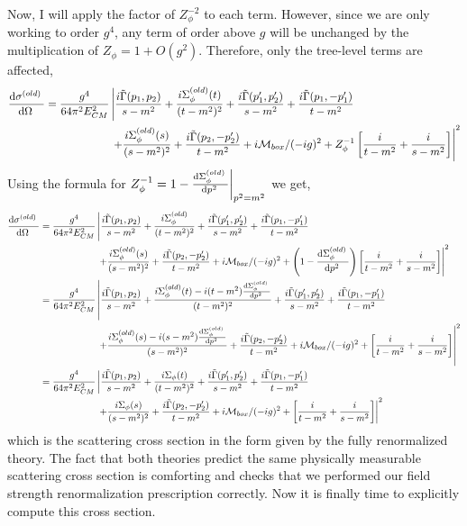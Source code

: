\documentclass[12pt]{extarticle}
\begin{document}
Now, I will apply the factor of $Z_\phi^{-2}$ to each term. However, since we are only working to order $g^4$, any term of order above $g$ will be unchanged by the multiplication of $Z_\phi = 1 + O(g^2)$. Therefore, only the tree-level terms are affected,
\begin{align*}
\frac{\mathrm{d}\sigma^{(old)} \:}{\mathrm{d}\Omega \:} &= \frac{g^4}{64 \pi^2 E_{CM}^2} \left|  \frac{ i\tilde{\Gamma}(p_1, p_2)}{s  - m^2} + \frac{i \Sigma_\phi^{(old)}(t)}{(t - m^2)^2} + \frac{i\tilde{\Gamma}(p_1', p_2')}{s - m^2} 
+  \frac{i\tilde{\Gamma}(p_1, -p_1')}{t - m^2} \right.
\\ 
& \left.
\quad \quad \quad \quad \quad \quad 
+ \frac{i \Sigma_\phi^{(old)}(s)}{(s - m^2)^2} + \frac{i\tilde{\Gamma}(p_2, -p_2')}{t - m^2} + i\mathcal{M}_{box}/(-ig)^2 + Z_\phi^{-1} \left[\frac{i}{t - m^2 } + \frac{i}{s - m^2 }\right] \right|^2 
\end{align*}  
Using the formula for $Z_\phi^{-1} = 1 - \frac{\mathrm{d}\Sigma_\phi^{(old)} \:}{\mathrm{d}p^2 \:} \bigg|_{p^2 = m^2}$ we get,
\begin{align*}
\frac{\mathrm{d}\sigma^{(old)} \:}{\mathrm{d}\Omega \:} &= \frac{g^4}{64 \pi^2 E_{CM}^2} \left|  \frac{i\tilde{\Gamma}(p_1, p_2)}{s  - m^2} + \frac{i \Sigma_\phi^{(old)}}{(t - m^2)^2} + \frac{i\tilde{\Gamma}(p_1', p_2')}{s - m^2} 
+  \frac{i\tilde{\Gamma}(p_1, -p_1')}{t - m^2} \right.
\\ 
& \left.
\quad \quad \quad \quad \quad \quad 
+ \frac{i \Sigma_\phi^{(old)}(s)}{(s - m^2)^2} + \frac{i\tilde{\Gamma}(p_2, -p_2')}{t - m^2} + i\mathcal{M}_{box}/(-ig)^2 + \left( 1 - \frac{\mathrm{d}\Sigma_\phi^{(old)} \:}{\mathrm{d}p^2 \:} \right) \left[\frac{i}{t - m^2 } + \frac{i}{s - m^2 }\right] \right|^2  
\\
&= \frac{g^4}{64 \pi^2 E_{CM}^2} \left|  \frac{ i\tilde{\Gamma}(p_1, p_2)}{s  - m^2} + \frac{i \Sigma_\phi^{(old)}(t) - i(t - m^2) \frac{\mathrm{d}\Sigma_\phi^{(old)} \:}{\mathrm{d}p^2 \:}}{(t - m^2)^2} + \frac{i\tilde{\Gamma}(p_1', p_2')}{s - m^2} 
+  \frac{i\tilde{\Gamma}(p_1, -p_1')}{t - m^2} \right.
\\ 
& \left.
\quad \quad \quad \quad \quad \quad 
+ \frac{i \Sigma_\phi^{(old)}(s) - i(s - m^2) \frac{\mathrm{d}\Sigma_\phi^{(old)} \:}{\mathrm{d}p^2 \:} }{(s - m^2)^2} + \frac{i\tilde{\Gamma}(p_2, -p_2')}{t - m^2} + i\mathcal{M}_{box}/(-ig)^2 + \left[\frac{i}{t - m^2 } + \frac{i}{s - m^2 }\right] \right|^2
\\
&= \frac{g^4}{64 \pi^2 E_{CM}^2} \left|  \frac{i \tilde{\Gamma}(p_1, p_2)}{s  - m^2} + \frac{i \Sigma_\phi(t)}{(t - m^2)^2} + \frac{i\tilde{\Gamma}(p_1', p_2')}{s - m^2} 
+  \frac{i\tilde{\Gamma}(p_1, -p_1')}{t - m^2} \right.
\\ 
& \left.
\quad \quad \quad \quad \quad \quad 
+ \frac{i \Sigma_\phi(s)}{(s - m^2)^2} + \frac{i\tilde{\Gamma}(p_2, -p_2')}{t - m^2} + i\mathcal{M}_{box}/(-ig)^2 + \left[\frac{i}{t - m^2 } + \frac{i}{s - m^2 }\right] \right|^2    
\end{align*}  
which is the scattering cross section in the form given by the fully renormalized theory. The fact that both theories predict the same physically measurable scattering cross section is comforting and checks that we performed our field strength renormalization prescription correctly. Now it is finally time to explicitly compute this cross section.
\end{document}
